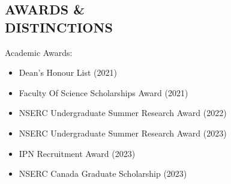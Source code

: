 \documentclass[margin, 10pt]{res} %
\begin{document}
\begin{resume}
		
		\section{AWARDS \& \\ DISTINCTIONS}
		Academic Awards:
		\vspace*{0.15cm}
		\begin{itemize}\itemsep -2pt %
			\item Dean's Honour List (2021)
			\item Faculty Of Science Scholarships Award (2021)
			\item NSERC Undergraduate Summer Research Award (2022)
			\item NSERC Undergraduate Summer Research Award (2023)
			\item IPN Recruitment Award (2023)
			\item NSERC Canada Graduate Scholarship (2023)
		\end{itemize}
		
		

\end{resume}
\end{document}
